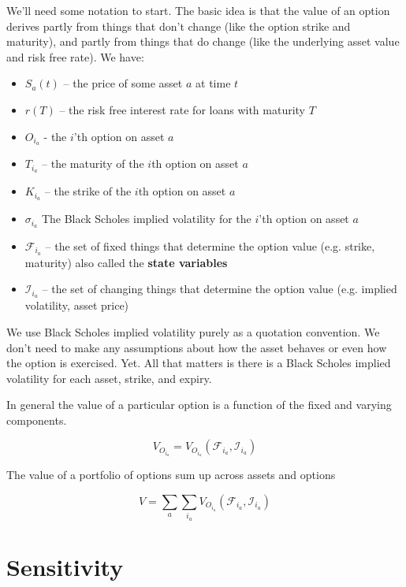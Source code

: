 We'll need some notation to start. The basic idea is that the value of an option derives partly from things that don't change (like the option strike and maturity), and partly from things that do change (like the underlying asset value and risk free rate). We have:

\begin{itemize}
\item $S_a(t)$ -- the price of some asset $a$ at time $t$\\
\item $r(T)$ -- the risk free interest rate for loans with maturity $T$\\
\item $O_{i_a}$ - the $i$'th option on asset $a$\\
\item $T_{i_a}$ -- the maturity of the $i$th option on asset $a$\\
\item $K_{i_a}$ -- the strike of the $i$th option on asset $a$\\
\item $\sigma_{i_a}$ The Black Scholes implied volatility for the $i$'th option on asset $a$\\
\item $\mathcal{F}_{i_a}$ -- the set of fixed things that determine the option value (e.g. strike, maturity) also called the \textbf{state variables}\\
\item $\mathcal{I}_{i_a}$ -- the set of changing things that determine the option value (e.g. implied volatility, asset price)\\
\end{itemize}

We use Black Scholes implied volatility purely as a quotation convention. We don't need to make any assumptions about how the asset behaves or even how the option is exercised. Yet. All that matters is there is a Black Scholes implied volatility for each asset, strike, and expiry.

In general the value of a particular option is a function of the fixed and varying components. 

\[V_{O_{i_a}} = V_{O_{i_a}}(\mathcal{F}_{i_a},\mathcal{I}_{i_a}) \]

The value of a portfolio of options sum up across assets and options

\[V = \sum_{a}\sum_{i_a}V_{O_{i_a}}(\mathcal{F}_{i_a},\mathcal{I}_{i_a}) \]

\section{Sensitivity}

